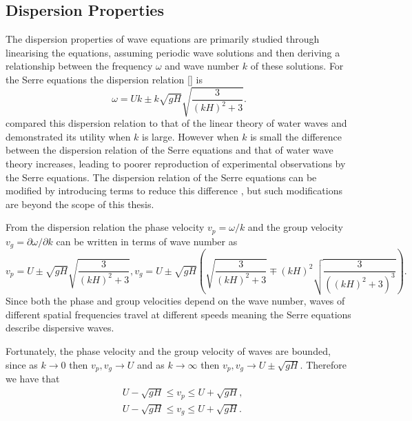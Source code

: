 \subsection{Dispersion Properties}
The dispersion properties of wave equations are primarily studied through linearising the equations, assuming periodic wave solutions and then deriving a relationship between the frequency $\omega$ and wave number $k$ of these solutions. For the Serre equations the dispersion relation [] is
\begin{equation}
\label{eqn:DispersionRelation}
\omega = Uk \pm k \sqrt{gH} \sqrt{\frac{3}{\left(kH\right)^2 + 3}}.
\end{equation}
\citet{Barthelemy-2004-315} compared this dispersion relation to that of the linear theory of water waves and demonstrated its utility when $k$ is large. However when $k$ is small the difference between the dispersion relation of the Serre equations and that of water wave theory increases, leading to poorer reproduction of experimental observations by the Serre equations. The dispersion relation of the Serre equations can be modified by introducing terms to reduce this difference \cite{Barthelemy-2004-315}, but such modifications are beyond the scope of this thesis.


From the dispersion relation the phase velocity $v_p = \omega / k$  and the group velocity $v_g = \partial \omega / \partial  k$ can be written in terms of wave number as
\begin{subequations}
	\label{eqn:WaveVelocities}
	\begin{equation}
	\label{eqn:WaveVelocitiesPhase}
	v_p = U \pm \sqrt{gH}\sqrt{\frac{3}{\left(kH\right)^2 + 3}},
	\end{equation}
	\begin{equation}
	\label{eqn:WaveVelocitiesGroup}
	v_g = U \pm \sqrt{gH} \left(\sqrt{\frac{3}{\left(kH\right)^2 + 3}} \mp \left(kH\right)^2 \sqrt{\frac{3}{\left(\left(kH\right)^2 + 3 \right)^3}}\right).
	\end{equation}
\end{subequations}
Since both the phase and group velocities depend on the wave number, waves of different spatial frequencies travel at different speeds meaning the Serre equations describe dispersive waves.

Fortunately, the phase velocity and the group velocity of waves are bounded, since as $k \rightarrow 0$ then $v_p,v_g \rightarrow U$ and as $k \rightarrow \infty$ then $v_p,v_g \rightarrow U \pm \sqrt{gH}$. Therefore we have that
\begin{subequations}
\begin{align}
&U - \sqrt{gH} \le v_p \le U + \sqrt{gH}, \label{eqn:WaveVelocitiesBound} \\
&U - \sqrt{gH} \le v_g \le U + \sqrt{gH}.
\end{align}
\end{subequations}

